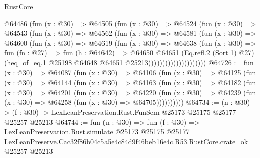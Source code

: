 \begin{lexlean}{RustCore}
\begin{coremodule}
                        @64486
                          (fun (x : @30) =>
                          @64505
                            (fun (x : @30) =>
                            @64524
                              (fun (x : @30) =>
                              @64543
                                (fun (x : @30) =>
                                @64562
                                  (fun (x : @30) =>
                                  @64581
                                    (fun (x : @30) =>
                                    @64600
                                      (fun (x : @30) =>
                                      @64619
                                        (fun (x : @30) =>
                                        @64638
                                          (fun (x : @30) =>
                                          fun (fn : @27) =>
                                          fun (h : @64642) =>
                                          @64650
                                            @64651
                                            (Eq.refl.{2} (Sort 1) @27)
                                            (heq_of_eq.{1}
                                              @25198
                                              @64648
                                              @64651
                                              @25213)))))))))))))))))))))
@64726 := fun (x : @30) =>
  @64087
    (fun (x : @30) =>
    @64106
      (fun (x : @30) =>
      @64125
        (fun (x : @30) =>
        @64144
          (fun (x : @30) =>
          @64163
            (fun (x : @30) =>
            @64182
              (fun (x : @30) =>
              @64201
                (fun (x : @30) =>
                @64220
                  (fun (x : @30) =>
                  @64239 (fun (x : @30) => @64258 (fun (x : @30) => @64705))))))))))
@64734 := (n : @30) ->
  (f : @30) -> LexLeanPreservation.Rust.FunSem @25173 @25175 @25177 @25257 @25213
@64744 := fun (n : @30) =>
  fun (f : @30) =>
  LexLeanPreservation.Rust.simulate
    @25173
    @25175
    @25177
    LexLeanPreserve.Cac32f86b04c5a5e4c84d9f46beb16e4c.R53.RustCore.crate_ok
    @25257
    @25213
\end{coremodule}
\end{lexlean}
